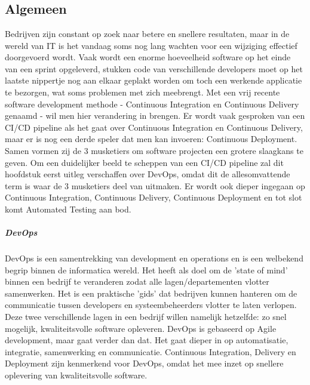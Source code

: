 \chapter{}
\label{ch:ci-cd-cd}
    \section{Algemeen}
    \label{sec:algemeen}
    Bedrijven zijn constant op zoek naar betere en snellere resultaten, maar in de wereld van IT is het vandaag soms nog lang wachten voor een wijziging effectief doorgevoerd wordt. Vaak wordt een enorme hoeveelheid software op het einde van een sprint opgeleverd, stukken code van verschillende developers moet op het laatste nippertje nog aan elkaar geplakt worden om toch een werkende applicatie te bezorgen, wat soms problemen met zich meebrengt. Met een vrij recente software development methode - Continuous Integration en Continuous Delivery genaamd - wil men hier verandering in brengen. Er wordt vaak gesproken van een CI/CD pipeline als het gaat over Continuous Integration en Continuous Delivery, maar er is nog een derde speler dat men kan invoeren: Continuous Deployment. Samen vormen zij de 3 musketiers om software projecten een grotere slaagkans te geven.
    Om een duidelijker beeld te scheppen van een CI/CD pipeline zal dit hoofdstuk eerst uitleg verschaffen over DevOps, omdat dit de allesomvattende term is waar de 3 musketiers deel van uitmaken. Er wordt ook dieper ingegaan op Continuous Integration, Continuous Delivery, Continuous Deployment en tot slot komt Automated Testing aan bod.
        \paragraph{DevOps}
        DevOps is een samentrekking van development en operations en is een welbekend begrip binnen de informatica wereld. Het heeft als doel om de 'state of mind' binnen een bedrijf te veranderen zodat alle lagen/departementen vlotter samenwerken. Het is een praktische 'gids' dat bedrijven kunnen hanteren om de communicatie tussen developers en systeembeheerders vlotter te laten verlopen. Deze twee verschillende lagen in een bedrijf willen namelijk hetzelfde: zo snel mogelijk, kwaliteitsvolle software opleveren. DevOps is gebaseerd op Agile development, maar gaat verder dan dat. Het gaat dieper in op automatisatie, integratie, samenwerking en communicatie. 
        Continuous Integration, Delivery en Deployment zijn kenmerkend voor DevOps, omdat het mee inzet op snellere oplevering van kwaliteitsvolle software. ~\autocite{Riti2018}
    
